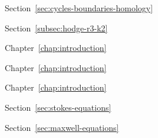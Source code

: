 \par\noindent\hspace*{0em}\label{index:boundary}\quad Section~\ref{sec:cycles-boundaries-homology}

\par\noindent\hspace*{0em}\label{index:boundary-conditions}

\par\noindent\hspace*{1em}\label{index:boundary-conditions-electric}\quad Section~\ref{subsec:hodge-r3-k2}

\par\noindent\hspace*{1em}\label{index:boundary-conditions-essential}\quad Chapter~\ref{chap:introduction}

\par\noindent\hspace*{1em}\label{index:boundary-conditions-magnetic}\quad Chapter~\ref{chap:introduction}

\par\noindent\hspace*{1em}\label{index:boundary-conditions-natural}\quad Chapter~\ref{chap:introduction}

\par\noindent\hspace*{1em}\label{index:boundary-conditions-no-slip}\quad Section~\ref{sec:stokes-equations}

\par\noindent\hspace*{1em}\label{index:boundary-conditions-perfect-conductor}\quad Section~\ref{sec:maxwell-equations}


